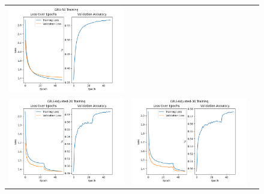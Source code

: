 \documentclass{article}
\begin{document}
\begin{enumerate}[label=1\alph*. ]
\begin{figure}[htb]
\begin{tabularx}{\textwidth}{XXX}
          \includegraphics{images/GRU-50_training_new.png} \\
          \includegraphics{images/GRU-Adjusted-20_training_new.png} &
          \includegraphics{images/GRU-Adjusted-30_training_new.png} &

\end{tabularx}
\end{figure}
\end{enumerate}
\end{document}
